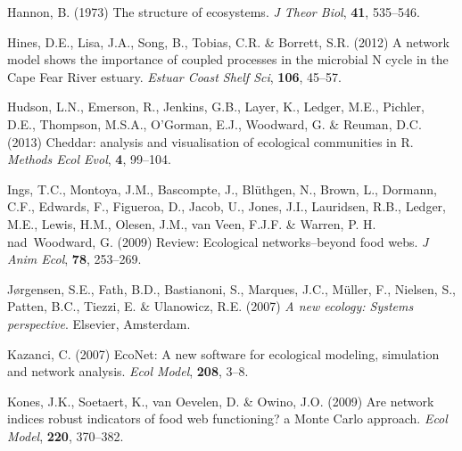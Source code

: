 \documentclass[11pt]{article}
\begin{document}
\begin{thebibliography}{75}
Hannon, B. (1973) The structure of ecosystems.
\newblock \emph{J Theor Biol}, \textbf{41}, 535--546.

Hines, D.E., Lisa, J.A., Song, B., Tobias, C.R. \& Borrett, S.R. (2012) A
  network model shows the importance of coupled processes in the microbial {N}
  cycle in the {Cape Fear River} estuary.
\newblock \emph{Estuar Coast Shelf Sci}, \textbf{106}, 45--57.

Hudson, L.N., Emerson, R., Jenkins, G.B., Layer, K., Ledger, M.E., Pichler,
  D.E., Thompson, M.S.A., O'Gorman, E.J., Woodward, G. \& Reuman, D.C. (2013)
  Cheddar: analysis and visualisation of ecological communities in {R}.
\newblock \emph{Methods Ecol Evol}, \textbf{4}, 99--104.

Ings, T.C., Montoya, J.M., Bascompte, J., Bl{\"u}thgen, N., Brown, L., Dormann,
  C.F., Edwards, F., Figueroa, D., Jacob, U., Jones, J.I., Lauridsen, R.B.,
  Ledger, M.E., Lewis, H.M., Olesen, J.M., van Veen, F.J.F. \& Warren, P. H.
  nad~Woodward, G. (2009) Review: Ecological networks--beyond food webs.
\newblock \emph{J Anim Ecol}, \textbf{78}, 253--269.

J{\o}rgensen, S.E., Fath, B.D., Bastianoni, S., Marques, J.C., M\"{u}ller, F.,
  Nielsen, S., Patten, B.C., Tiezzi, E. \& Ulanowicz, R.E. (2007) \emph{A new
  ecology: Systems perspective}.
\newblock Elsevier, Amsterdam.

Kazanci, C. (2007) Eco{N}et: A new software for ecological modeling, simulation
  and network analysis.
\newblock \emph{Ecol Model}, \textbf{208}, 3--8.

Kones, J.K., Soetaert, K., van Oevelen, D. \& Owino, J.O. (2009) Are network
  indices robust indicators of food web functioning? a {M}onte {C}arlo
  approach.
\newblock \emph{Ecol Model}, \textbf{220}, 370--382.


\end{thebibliography}
\end{document}
